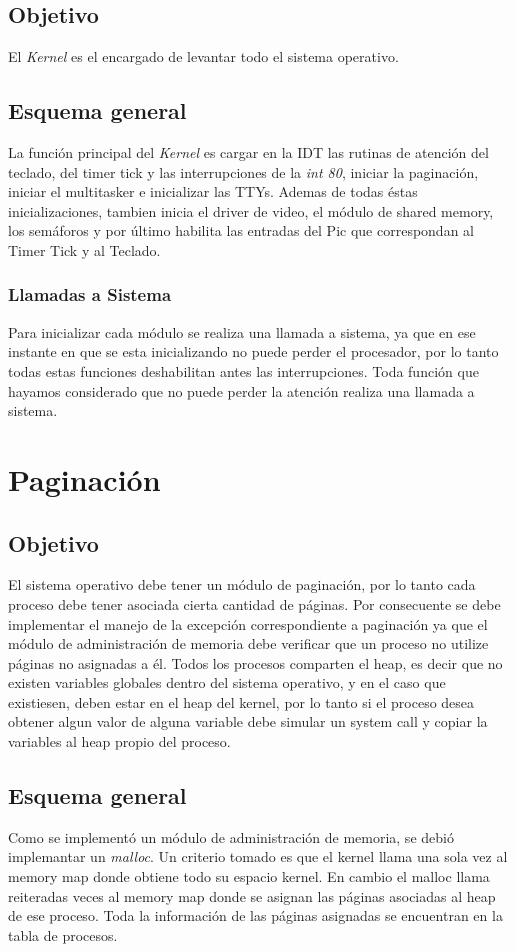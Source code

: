 \documentclass[10pt,a4paper]{article}
\begin{document}
	\subsection{Objetivo}
		El \textit{Kernel} es el encargado de levantar todo el sistema operativo.
	\subsection{Esquema general}
		La funci\'on principal del \textit{Kernel} es cargar en la IDT las rutinas de atenci\'on del teclado, del timer tick y las interrupciones de la \textit{int 80}, iniciar la paginaci\'on, iniciar el multitasker e inicializar las TTYs. Ademas de todas \'estas inicializaciones, tambien inicia el driver de video, el m\'odulo de shared memory, los sem\'aforos y por \'ultimo habilita las entradas del Pic que correspondan al Timer Tick y al Teclado. 
	\subsubsection{Llamadas a Sistema}
		Para inicializar cada m\'odulo se realiza una llamada a sistema, ya que en ese instante en que se esta inicializando no puede perder el procesador, por lo tanto todas estas funciones deshabilitan antes las interrupciones. Toda funci\'on que hayamos considerado que no puede perder la atenci\'on realiza una llamada a sistema.

\section{Paginaci\'on}
	\subsection{Objetivo}
		El sistema operativo debe tener un m\'odulo de paginaci\'on, por lo tanto cada proceso debe tener asociada cierta cantidad de p\'aginas. Por consecuente se debe implementar el manejo de la excepci\'on correspondiente a paginaci\'on ya que el m\'odulo de administraci\'on de memoria debe verificar que un proceso no utilize p\'aginas no asignadas a \'el. Todos los procesos comparten el heap, es decir que no existen variables globales dentro del sistema operativo, y en el caso que existiesen, deben estar en el heap del kernel, por lo tanto si el proceso desea obtener algun valor de alguna variable debe simular un system call y copiar la variables al heap propio del proceso.
	\subsection{Esquema general}
		Como se implement\'o un m\'odulo de administraci\'on de memoria, se debi\'o implemantar un \textit{malloc}. Un criterio tomado es que el kernel llama una sola vez al memory map donde obtiene todo su espacio kernel. En cambio el malloc llama reiteradas veces al memory map donde se asignan las p\'aginas asociadas al heap de ese proceso. Toda la informaci\'on de las p\'aginas asignadas se encuentran en la tabla de procesos.
\end{document}
